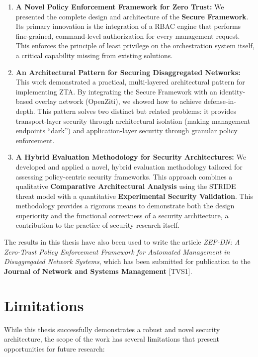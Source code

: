 \documentclass[12pt, a4paper, reqno, oneside]{book}
\newcommand \sect[1]{%
  \section*{#1}%
  \addcontentsline{toc}{section}{#1}}
\begin{document}
\begin{enumerate}
    \item \textbf{A Novel Policy Enforcement Framework for Zero Trust:} We presented the complete design and architecture of the \textbf{Secure Framework}. Its primary innovation is the integration of a RBAC engine that performs fine-grained, command-level authorization for every management request. This enforces the principle of least privilege on the orchestration system itself, a critical capability missing from existing solutions.

    \item \textbf{An Architectural Pattern for Securing Disaggregated Networks:} This work demonstrated a practical, multi-layered architectural pattern for implementing ZTA. By integrating the Secure Framework with an identity-based overlay network (OpenZiti), we showed how to achieve defense-in-depth. This pattern solves two distinct but related problems: it provides transport-layer security through architectural isolation (making management endpoints ``dark'') and application-layer security through granular policy enforcement.

    \item \textbf{A Hybrid Evaluation Methodology for Security Architectures:} We developed and applied a novel, hybrid evaluation methodology tailored for assessing policy-centric security frameworks. This approach combines a qualitative \textbf{Comparative Architectural Analysis} using the STRIDE threat model with a quantitative \textbf{Experimental Security Validation}. This methodology provides a rigorous means to demonstrate both the design superiority and the functional correctness of a security architecture, a contribution to the practice of security research itself.
\end{enumerate}
The results in this thesis have also been used to write the article \textit{ZEP-DN: A Zero-Trust Policy Enforcement Framework for Automated Management in Disaggregated Network Systems}, which has been submitted for publication to the \textbf{Journal of Network and Systems Management} [TVS1].

\sect{Limitations}
\label{sec:limitations}

While this thesis successfully demonstrates a robust and novel security architecture, the scope of the work has several limitations that present opportunities for future research:
\end{document}
